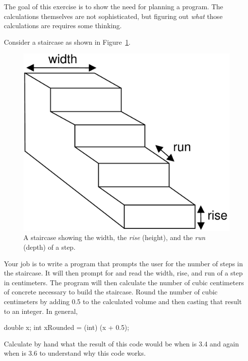 \begin{exercise}
The goal of this exercise is to show the need for planning a program. The calculations themselves are not sophisticated, but figuring out {\em what} those calculations are requires some thinking.

Consider a staircase as shown in Figure~\ref{fig.staircase}.

\begin{figure}[!h]
\begin{center}
\includegraphics[scale=0.3]{figs/ch03/staircase.pdf}
\caption{A staircase showing the width, the {\em rise} (height), and the {\em run} (depth) of a step.}
\label{fig.staircase}
\end{center}
\end{figure}

Your job is to write a program that prompts the user for the number of steps in the staircase. It will then prompt for and read the width, rise, and run of a step in centimeters. The program will then calculate the number of cubic centimeters of concrete necessary to build the staircase. Round the number of cubic centimeters by adding 0.5 to the calculated volume and then casting that result to an integer.  In general,

\begin{code}
double x;
int xRounded = (int) (x + 0.5);
\end{code}

Calculate by hand what the result of this code would be when  is 3.4 and again when  is 3.6 to understand why this code works.


\end{exercise}
